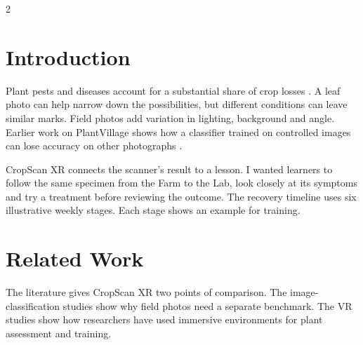 \documentclass[a4paper,11pt]{article}
\begin{document}
\begin{multicols}{2}
\section{Introduction}
Plant pests and diseases account for a substantial share of crop losses \cite{fao}. A leaf photo can help narrow down the possibilities, but different conditions can leave similar marks. Field photos add variation in lighting, background and angle. Earlier work on PlantVillage shows how a classifier trained on controlled images can lose accuracy on other photographs \cite{mohanty}.

\columnbreak
CropScan XR connects the scanner's result to a lesson. I wanted learners to follow the same specimen from the Farm to the Lab, look closely at its symptoms and try a treatment before reviewing the outcome. The recovery timeline uses six illustrative weekly stages. Each stage shows an example for training.
\end{multicols}

\clearpage
\section{Related Work}
The literature gives CropScan XR two points of comparison. The image-classification studies show why field photos need a separate benchmark. The VR studies show how researchers have used immersive environments for plant assessment and training.
\end{document}

